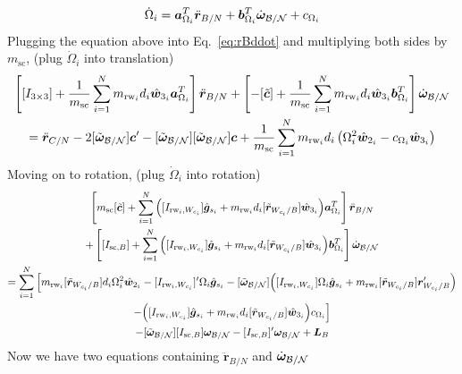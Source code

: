 \documentclass[]{BasiliskReportMemo}
\begin{document}
\begin{equation}
\dot{\Omega}_i = \bm{a}_{\Omega_i}^T\ddot{\bm r}_{B/N} + \bm{b}_{\Omega_i}^T\dot{\bm\omega}_{\cal B/N} + c_{\Omega_i}
\end{equation}
Plugging the equation above into Eq.~\eqref{eq:rBddot} and multiplying both sides by $m_\text{sc}$, (plug $\dot{\Omega}_i$ into translation)
\begin{multline}
\left[ [I_{3\times3}] +\frac{1}{m_{\text{sc}}}\sum\limits_{i=1}^{N}m_{\text{rw}_i}d_i\hat{\bm{w}}_{3_i}\bm{a}_{\Omega_i}^T \right] \ddot{\bm r}_{B/N} +\left[ -[\tilde{\bm{c}}] + \frac{1}{m_{\text{sc}}}\sum\limits_{i=1}^{N}m_{\text{rw}_i}d_i\hat{\bm{w}}_{3_i}\bm{b}_{\Omega_i}^T \right] \dot{\bm\omega}_{\cal B/N}
\\= \ddot{\bm r}_{C/N}   - 2[\tilde{\bm\omega}_{\cal B/N}]\bm{c}'-[\tilde{\bm\omega}_{\cal B/N}][\tilde{\bm\omega}_{\cal B/N}]\bm{c} + \frac{1}{m_{\text{sc}}}\sum\limits_{i=1}^{N}m_{\text{rw}_i}d_i\left(\Omega_i^2\hat{\bm{w}}_{2_i}-c_{\Omega_i}\hat{\bm{w}}_{3_i}\right)
\end{multline}
Moving on to rotation, (plug $\dot{\Omega}_i$ into rotation)
\begin{multline}
\left[ m_{\text{sc}}[\tilde{\bm c}]+ \sum\limits_{i=1}^{N}\Big([I_{\text{rw}_i,W_{c_i}}]\hat{\bm{g}}_{s_i} + m_{\text{rw}_i}d_i[\tilde{\bm{r}}_{W_{c_i}/B}]\hat{\bm{w}}_{3_i}\Big)\bm{a}_{\Omega_i}^T \right] \ddot{\bm r}_{B/N}
\\
+ \left[ [I_{\text{sc},B}] + \sum\limits_{i=1}^{N}\Big([I_{\text{rw}_i,W_{c_i}}]\hat{\bm{g}}_{s_i} + m_{\text{rw}_i}d_i[\tilde{\bm{r}}_{W_{c_i}/B}]\hat{\bm{w}}_{3_i}\Big)\bm{b}_{\Omega_i}^T \right] \dot{\bm\omega}_{\cal B/N}
\\=
\sum\limits_{i=1}^{N}\Big[ m_{\text{rw}_i}[\tilde{\bm{r}}_{W_{c_i}/B}]d_i \Omega_i^2\hat{\bm{w}}_{2_i}-[I_{\text{rw}_i,W_{c_i}}]'\Omega_i \hat{\bm{g}}_{s_i} -[\tilde{\bm\omega}_{\cal B/N}]\Big([I_{\text{rw}_i,W_{c_i}}]\Omega_i \hat{\bm{g}}_{s_i}+ m_{\text{rw}_i}[\tilde{\bm{r}}_{W_{c_i}/B}]\bm{r}'_{W_{c_i}/B}\Big) \\
-\Big([I_{\text{rw}_i,W_{c_i}}]\hat{\bm{g}}_{s_i} + m_{\text{rw}_i}d_i[\tilde{\bm{r}}_{W_{c_i}/B}]\hat{\bm{w}}_{3_i}\Big)c_{\Omega_i}\Big]
\\  -[\tilde{\bm\omega}_{\cal B/N}][I_{\text{sc},B}]\bm\omega_{\cal B/N}-  [I_{\text{sc},B}]'\bm\omega_{\cal B/N} + \bm{L}_B
\end{multline}
Now we have two equations containing $\ddot{\bm{r}}_{B/N}$ and $\dot{\bm\omega}_{\cal B/N}$
\end{document}
